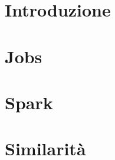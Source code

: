 \providecommand{\main}{.}







{\hypersetup{hidelinks}
  \tableofcontents  %
}

\chapter{Introduzione}


\chapter{Jobs}


\chapter{Spark}


\chapter{Similarità}


%

\appendix
%



